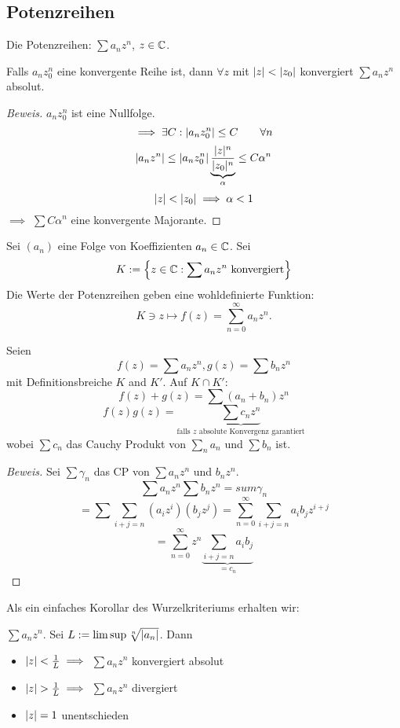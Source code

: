 \subsection{Potenzreihen}
\begin{Def}
  Die Potenzreihen: $\sum a_nz^n$, $z\in\mathbb{C}$.
\end{Def}
\begin{Lem}
  Falls $a_nz_0^n$ eine konvergente Reihe ist, dann $\forall z$ mit $\mathopen| z \mathclose|<\mathopen| z_0 \mathclose|$ konvergiert $\sum a_nz^n$ absolut.
\end{Lem}
\begin{proof}[Beweis]
  $a_nz_0^n$ ist eine Nullfolge.
  \[\implies \exists C:\mathopen| a_nz_0^n \mathclose|\leq C\qquad\forall n\]
  \[\mathopen| a_nz^n \mathclose|\leq\mathopen| a_nz^n_0 \mathclose|\underbrace{\frac{\mathopen| z \mathclose|^n}{\mathopen| z_0 \mathclose|^n}}_\alpha\leq C\alpha^n\]
  \[\mathopen| z \mathclose|<\mathopen| z_0 \mathclose|\implies \alpha<1\]
  $\implies$ $\sum C\alpha^n$ eine konvergente Majorante.
\end{proof}
  Sei $(a_n)$ eine Folge von Koeffizienten $a_n\in\mathbb{C}$. Sei 
\[K:=\left\{ z\in\mathbb{C}:\sum a_nz^n\text{ konvergiert} \right\}\] 
Die Werte der Potenzreihen geben eine wohldefinierte Funktion:
\[K\ni z\mapsto f(z)=\sum^\infty_{n=0}a_nz^n.\]

\begin{Sat}
Seien
\[f(z)=\sum a_nz^n, g(z)=\sum b_nz^n\]
mit Definitionsbreiche $K$ and $K'$.
Auf $K\cap K'$:
\[f(z)+g(z)=\sum(a_n+b_n)z^n\]
\[f(z)g(z)=\underbrace{\sum c_nz^n}_{\text{falls $z$ absolute Konvergenz garantiert}}\]
wobei $\sum c_n$ das Cauchy Produkt von $\sum_n a_n$ und $\sum b_n$ ist.
\end{Sat}
\begin{proof}[Beweis]
  Sei $\sum \gamma_n$ das CP von $\sum a_nz^n$ und $b_nz^n$.
  \[\sum a_nz^n\sum b_nz^n = sum \gamma_n\]
  \[=\sum\sum_{i+j=n}\left( a_iz^i \right)\left( b_jz^j \right)=\sum^\infty_{n=0}\sum_{i+j=n}a_ib_jz^{i+j}\]
  \[=\sum_{n=0}^\infty z^n\underbrace{\sum_{i+j=n}a_ib_j}_{=c_n}\]
\end{proof}
Als ein einfaches Korollar des Wurzelkriteriums erhalten wir:
\begin{Sat} $\sum a_nz^n$. Sei $L:=\limsup \sqrt[n]{\mathopen| a_n \mathclose|}$. Dann 
  \begin{itemize}
    \item $\mathopen| z \mathclose|<\frac{1}{L}\implies$ $\sum a_nz^n$ konvergiert absolut
    \item $\abs{z}>\frac{1}{L}\implies$ $\sum a_nz^n$ divergiert
    \item $\mathopen| z \mathclose|=1$ unentschieden
  \end{itemize}
\end{Sat}
